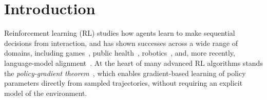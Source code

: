 \vspace{-8mm}
\section{Introduction}
\label{sec:intro}


Reinforcement learning (RL) studies how agents learn to make sequential decisions from interaction, and has shown successes across a wide range of domains, including games~\cite{mnih15nature-dqnonatari, silver16nature-alphago, silver17nature-alphazero}, public health~\cite{komorowski18nature-rlmedicine, bastani21nature-rlmedicine}, robotics~\cite{andrychowicz20ijrr-learning, song23sciencerobotics-autonomousracing}, and, more recently, language-model alignment~\cite{ouyang22neurips-rlhf, openai24arxiv-gpt4technicalreport}. At the heart of many advanced RL algorithms stands the \emph{policy-gradient theorem}~\cite{sutton98book-rlbook,sutton99neurips-policygradient,williams92ml-reinforce}, which enables gradient-based learning of policy parameters directly from sampled trajectories, without requiring an explicit model of the environment.

